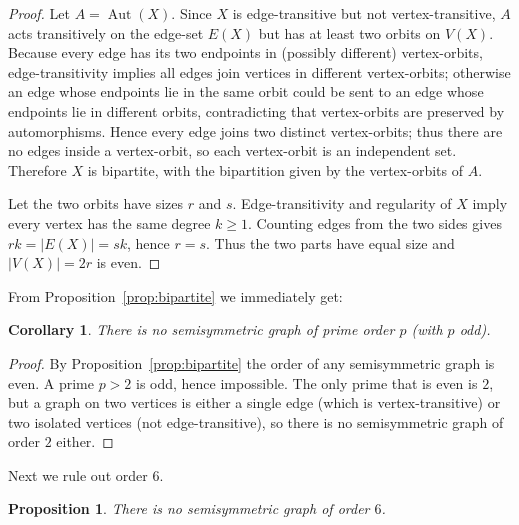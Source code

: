 \documentclass[12pt,a4paper,openany]{book}
\newtheorem{proposition}{Proposition}[section]
\newtheorem{corollary}{Corollary}[section]
\begin{document}
\begin{proof}
Let $A=\operatorname{Aut}(X)$. Since $X$ is edge-transitive but not vertex-transitive, $A$ acts transitively on the edge-set $E(X)$ but has at least two orbits on $V(X)$. Because every edge has its two endpoints in (possibly different) vertex-orbits, edge-transitivity implies all edges join vertices in different vertex-orbits; otherwise an edge whose endpoints lie in the same orbit could be sent to an edge whose endpoints lie in different orbits, contradicting that vertex-orbits are preserved by automorphisms. Hence every edge joins two distinct vertex-orbits; thus there are no edges inside a vertex-orbit, so each vertex-orbit is an independent set. Therefore $X$ is bipartite, with the bipartition given by the vertex-orbits of $A$.

Let the two orbits have sizes $r$ and $s$. Edge-transitivity and regularity of $X$ imply every vertex has the same degree $k\ge1$. Counting edges from the two sides gives $rk=|E(X)|=sk$, hence $r=s$. Thus the two parts have equal size and $|V(X)|=2r$ is even.
\end{proof}

From Proposition~\ref{prop:bipartite} we immediately get:

\begin{corollary}\label{cor:prime}
There is no semisymmetric graph of prime order $p$ (with $p$ odd).
\end{corollary}

\begin{proof}
By Proposition~\ref{prop:bipartite} the order of any semisymmetric graph is even. A prime $p>2$ is odd, hence impossible. The only prime that is even is $2$, but a graph on two vertices is either a single edge (which is vertex-transitive) or two isolated vertices (not edge-transitive), so there is no semisymmetric graph of order $2$ either.
\end{proof}

Next we rule out order $6$.

\begin{proposition}\label{prop:6}
There is no semisymmetric graph of order $6$.
\end{proposition}
\end{document}
